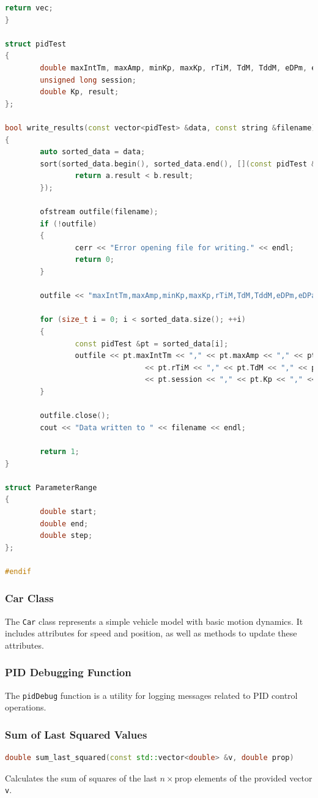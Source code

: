 \documentclass[a4paper,12pt]{article}
\begin{document}
\begin{lstlisting}[language=C++]
        return vec;
}

struct pidTest
{
        double maxIntTm, maxAmp, minKp, maxKp, rTiM, TdM, TddM, eDPm, eDPa;
        unsigned long session;
        double Kp, result;
};

bool write_results(const vector<pidTest> &data, const string &filename)
{
        auto sorted_data = data;
        sort(sorted_data.begin(), sorted_data.end(), [](const pidTest &a, const pidTest &b) {
                return a.result < b.result;
        });

        ofstream outfile(filename);
        if (!outfile)
        {
                cerr << "Error opening file for writing." << endl;
                return 0;
        }

        outfile << "maxIntTm,maxAmp,minKp,maxKp,rTiM,TdM,TddM,eDPm,eDPa,session,Kp,result\n";

        for (size_t i = 0; i < sorted_data.size(); ++i)
        {
                const pidTest &pt = sorted_data[i];
                outfile << pt.maxIntTm << "," << pt.maxAmp << "," << pt.minKp << "," << pt.maxKp << ","
                                << pt.rTiM << "," << pt.TdM << "," << pt.TddM << "," << pt.eDPm << "," << pt.eDPa << ","
                                << pt.session << "," << pt.Kp << "," << pt.result << "\n";
        }

        outfile.close();
        cout << "Data written to " << filename << endl;

        return 1;
}

struct ParameterRange
{
        double start;
        double end;
        double step;
};

#endif
\end{lstlisting}
\subsubsection{Car Class}
The \texttt{Car} class represents a simple vehicle model with basic motion dynamics. It includes attributes for speed and position, as well as methods to update these attributes.
\subsubsection{PID Debugging Function}
The \texttt{pidDebug} function is a utility for logging messages related to PID control operations.
\subsubsection{Sum of Last Squared Values}
\begin{lstlisting}[language=cpp]
double sum_last_squared(const std::vector<double> &v, double prop)
\end{lstlisting}
Calculates the sum of squares of the last $n \times \text{prop}$ elements of the provided vector \texttt{v}.
\end{document}
